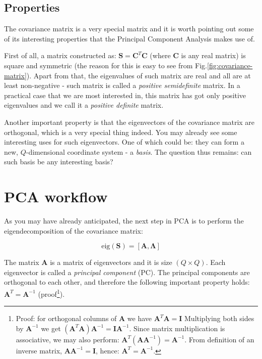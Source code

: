 \documentclass[10pt,twocolumn]{article}
\begin{document}
\subsection{Properties}

The covariance matrix is a very special matrix and it is worth pointing out some of its interesting properties that the Principal Component Analysis makes use of.

First of all, a matrix constructed as: $\bm{S} = \bm{C}^T \bm{C}$ (where $\bm{C}$ is any real matrix) is square and symmetric (the reason for this is easy to see from Fig.\ref{fig:covariance-matrix}). Apart from that, the eigenvalues of such matrix are real and all are at least non-negative - such matrix is called a \textit{positive semidefinite} matrix. In a practical case that we are most interested in, this matrix has got only positive eigenvalues and we call it a \textit{positive definite} matrix.

Another important property is that the eigenvectors of the covariance matrix are orthogonal, which is a very special thing indeed. You may already see some interesting uses for such eigenvectors. One of which could be: they can form a new, $Q$-dimensional coordinate system - a \textit{basis}. The question thus remains: can such basis be any interesting basis?

\section{PCA workflow}

As you may have already anticipated, the next step in PCA is to perform the eigendecomposition of the covariance matrix:

\begin{equation} \label{eq:eig-dec}
\text{eig}(\bm{S}) = [\bm{A}, \bm{\Lambda}]
\end{equation}

The matrix $\bm{A}$ is a matrix of eigenvectors and it is size $(Q \times Q)$. Each eigenvector is called a \textit{principal component} (PC). The principal components are orthogonal to each other, and therefore the following important property holds: $\bm{A}^T = \bm{A}^{-1}$ (proof\footnote{Proof: for orthogonal columns of $\bm{A}$ we have $\bm{A}^T \bm{A} = \bm{I}$ Multiplying both sides by $\bm{A}^{-1}$ we get $(\bm{A}^T \bm{A}) \bm{A}^{-1}= \bm{I}\bm{A}^{-1}$. Since matrix multiplication is associative, we may also perform: $\bm{A}^T (\bm{A} \bm{A}^{-1}) = \bm{A}^{-1}$. From definition of an inverse matrix,  $\bm{A} \bm{A}^{-1} = \bm{I}$, hence: $\bm{A}^T = \bm{A}^{-1}$.}).
\end{document}
